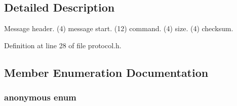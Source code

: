 \subsection{Detailed Description}
Message header. (4) message start. (12) command. (4) size. (4) checksum. 

Definition at line 28 of file protocol.\+h.



\subsection{Member Enumeration Documentation}
\hypertarget{class_c_message_header_a00659410ff6010c972826dc3020e18b1}{}\subsubsection[{anonymous enum}]{\setlength{\rightskip}{0pt plus 5cm}anonymous enum}\label{class_c_message_header_a00659410ff6010c972826dc3020e18b1}
